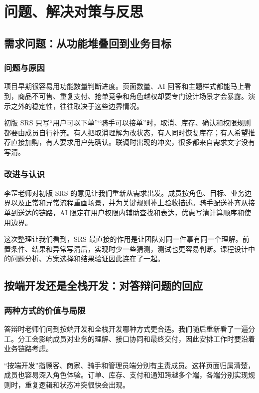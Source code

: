 \chapter{问题、解决对策与反思}
\section{需求问题：从功能堆叠回到业务目标}
\subsection{问题与原因}
项目早期很容易用功能数量判断进度。页面数量、AI 回答和主题样式都能马上看到，商品不可售、重复支付、抢单竞争和角色越权却要专门设计场景才会暴露。演示之外的稳定性，往往取决于这些边界情况。

初版 SRS 只写“用户可以下单”“骑手可以接单”时，取消、库存、确认和权限规则都要由成员自行补充。有人把取消理解为改状态，有人同时恢复库存；有人希望推荐直接加购，有人要求用户先确认。联调时出现的冲突，很多都来自需求文字没有写清。
\subsection{改进与认识}
李罡老师对初版 SRS 的意见让我们重新从需求出发。成员按角色、目标、业务边界以及正常和异常流程重画场景，并为关键规则补上验收描述。骑手配送补齐从接单到送达的链路，AI 限定在用户权限内辅助查找和表达，优惠写清计算顺序和使用边界。

这次整理让我们看到，SRS 最直接的作用是让团队对同一件事有同一个理解。前置条件、结果和异常写清后，实现时少一些猜测，测试也更容易判断。课程设计中的问题分析、方案选择和结果验证因此连在了一起。
\section{按端开发还是全栈开发：对答辩问题的回应}
\subsection{两种方式的价值与局限}
答辩时老师们问到按端开发和全栈开发哪种方式更合适。我们随后重新看了一遍分工。分工会影响成员对业务的理解、接口协同和最终交付，因此安排工作时要沿着业务链路考虑。

“按端开发”指顾客、商家、骑手和管理员端分别有主责成员。这样页面归属清楚，成员也容易深入角色体验。订单、库存、支付和通知跨越多个端，各端分别实现规则时，重复逻辑和状态冲突很快会出现。

